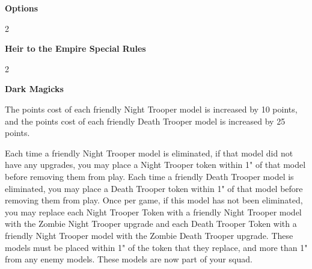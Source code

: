 \documentclass{article}
\begin{document}
\vspace{0.3cm}
{\scriptsize
\setlength\extrarowheight{1.5pt}

}
\vspace{0.6cm}

{\large \textbf{Options}}
\vspace{0.3cm}
\begin{multicols}{2}
    {\scriptsize

    \setlength\extrarowheight{1.5pt}
    

    \vspace{0.6cm}

    \setlength\extrarowheight{1.5pt}
    

    \vspace{0.6cm}

    \setlength\extrarowheight{1.5pt}
    
    }
\end{multicols}

\vspace{0.6cm}

{\large \textbf{Heir to the Empire Special Rules}}
\vspace{0.3cm}
\begin{multicols}{2}
    {\scriptsize

    \begin{minipage}{9cm}
        {\normalsize \textbf{Dark Magicks}}
        \vspace{0.3cm}

        The points cost of each friendly Night Trooper model is increased by 10 points, 
        and the points cost of each friendly Death Trooper model is increased by 25 points.

        \vspace{0.3cm}
        Each time a friendly Night Trooper model is eliminated, if that model did not have any upgrades,
        you may place a Night Trooper token within 1" of that model before removing them from play.
        Each time a friendly Death Trooper model is eliminated, you may place a 
        Death Trooper token within 1" of that model before removing them from play.
        Once per game, if this model has not been eliminated, you may replace
        each Night Trooper Token with a friendly Night Trooper model with the Zombie Night Trooper upgrade
        and each Death Trooper Token with a friendly Night Trooper model with the Zombie Death Trooper upgrade.
        These models must be placed within 1" of the token that they replace, and more than 1" from any enemy models.
        These models are now part of your squad.
    \end{minipage}

    }
\end{multicols}
\end{document}
